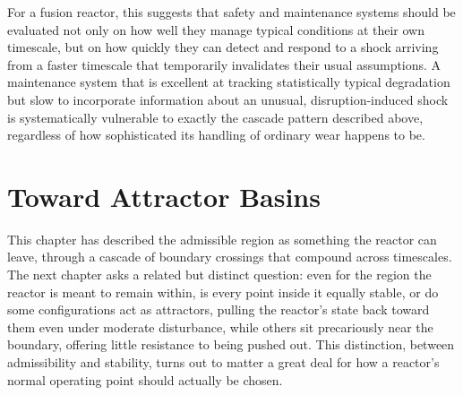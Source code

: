 For a fusion reactor, this suggests that safety and maintenance systems should be evaluated not only on how well they manage typical conditions at their own timescale, but on how quickly they can detect and respond to a shock arriving from a faster timescale that temporarily invalidates their usual assumptions. A maintenance system that is excellent at tracking statistically typical degradation but slow to incorporate information about an unusual, disruption-induced shock is systematically vulnerable to exactly the cascade pattern described above, regardless of how sophisticated its handling of ordinary wear happens to be.

\section{Toward Attractor Basins}

This chapter has described the admissible region as something the reactor can leave, through a cascade of boundary crossings that compound across timescales. The next chapter asks a related but distinct question: even for the region the reactor is meant to remain within, is every point inside it equally stable, or do some configurations act as attractors, pulling the reactor's state back toward them even under moderate disturbance, while others sit precariously near the boundary, offering little resistance to being pushed out. This distinction, between admissibility and stability, turns out to matter a great deal for how a reactor's normal operating point should actually be chosen.
